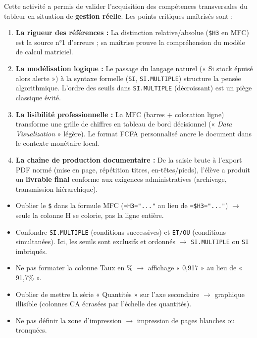 \documentclass[11pt]{article}
\newcounter{popsec}
\newcounter{popsub}
\newcommand{\courssub}[1]{%
  \stepcounter{popsub}%
  \par\vspace{9pt}\noindent{\popxbold\fontsize{11.5}{13}\selectfont\color{popink}{\color{poporange}\thepopsec.\thepopsub}\hspace{6pt}#1}\par\nopagebreak\vspace{4pt}
}
\begin{document}
\courssub{Bilan de l'activité}
Cette activité a permis de valider l'acquisition des compétences transversales du tableur en situation de \textbf{gestion réelle}. Les points critiques maîtrisés sont :
\begin{enumerate}
    \item \textbf{La rigueur des références :} La distinction relative/absolue (\texttt{\$H3} en MFC) est la source n°1 d'erreurs ; sa maîtrise prouve la compréhension du modèle de calcul matriciel.
    \item \textbf{La modélisation logique :} Le passage du langage naturel (« Si stock épuisé alors alerte ») à la syntaxe formelle (\texttt{SI}, \texttt{SI.MULTIPLE}) structure la pensée algorithmique. L'ordre des seuils dans \texttt{SI.MULTIPLE} (décroissant) est un piège classique évité.
    \item \textbf{La lisibilité professionnelle :} La MFC (barres + coloration ligne) transforme une grille de chiffres en tableau de bord décisionnel (« \textit{Data Visualization} » légère). Le format FCFA personnalisé ancre le document dans le contexte monétaire local.
    \item \textbf{La chaîne de production documentaire :} De la saisie brute à l'export PDF normé (mise en page, répétition titres, en-têtes/pieds), l'élève a produit un \textbf{livrable final} conforme aux exigences administratives (archivage, transmission hiérarchique).
\end{enumerate}
\begin{attention}
\begin{itemize}
    \item Oublier le \texttt{\$} dans la formule MFC (\texttt{=H3="..."} au lieu de \texttt{=\$H3="..."}) $\rightarrow$ seule la colonne H se colorie, pas la ligne entière.
    \item Confondre \texttt{SI.MULTIPLE} (conditions successives) et \texttt{ET/OU} (conditions simultanées). Ici, les seuils sont exclusifs et ordonnés $\rightarrow$ \texttt{SI.MULTIPLE} ou \texttt{SI} imbriqués.
    \item Ne pas formater la colonne Taux en \% $\rightarrow$ affichage « 0,917 » au lieu de « 91,7\% ».
    \item Oublier de mettre la série « Quantités » sur l'axe secondaire $\rightarrow$ graphique illisible (colonnes CA écrasées par l'échelle des quantités).
    \item Ne pas définir la zone d'impression $\rightarrow$ impression de pages blanches ou tronquées.
\end{itemize}
\end{attention}
\end{document}
